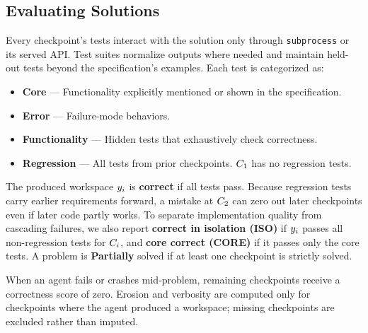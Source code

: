 \subsection{Evaluating Solutions}
Every checkpoint's tests interact with the solution only through \texttt{subprocess} or its served API. Test suites normalize outputs where needed and maintain held-out tests beyond the specification's examples. Each test is categorized as:
\begin{itemize}
    \item \textbf{Core} --- Functionality explicitly mentioned or shown in the specification.
    \item \textbf{Error} --- Failure-mode behaviors.
    \item \textbf{Functionality} --- Hidden tests that exhaustively check correctness.
    \item \textbf{Regression} --- All tests from prior checkpoints. $C_{1}$ has no regression tests.
\end{itemize}

The produced workspace $y_{i}$ is \textbf{correct} if all tests pass. Because regression tests carry earlier requirements forward, a mistake at $C_{2}$ can zero out later checkpoints even if later code partly works. To separate implementation quality from cascading failures, we also report \textbf{correct in isolation (ISO)} if $y_{i}$ passes all non-regression tests for $C_{i}$, and \textbf{core correct (CORE)} if it passes only the core tests. A problem is \textbf{Partially} solved if at least one checkpoint is strictly solved.

When an agent fails or crashes mid-problem, remaining checkpoints receive a correctness score of zero. Erosion and verbosity are computed only for checkpoints where the agent produced a workspace; missing checkpoints are excluded rather than imputed.

